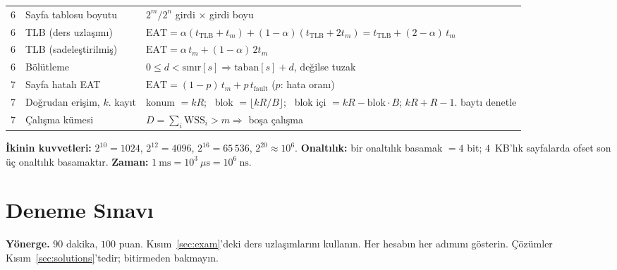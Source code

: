 \begin{center}
\begin{tabularx}{\linewidth}{@{}c >{\raggedright\arraybackslash}p{4.3cm} >{\raggedright\arraybackslash}X@{}}
6 & Sayfa tablosu boyutu & $2^{m}/2^{n}$ girdi $\times$ girdi boyu \\
6 & TLB (ders uzlaşımı) & $\text{EAT} = \alpha(t_{\text{TLB}} + t_m) + (1-\alpha)(t_{\text{TLB}} + 2t_m) = t_{\text{TLB}} + (2-\alpha)\,t_m$ \\
6 & TLB (sadeleştirilmiş) & $\text{EAT} = \alpha\,t_m + (1-\alpha)\,2t_m$ \\
6 & Bölütleme & $0 \le d < \text{sınır}[s] \Rightarrow \text{taban}[s] + d$, değilse tuzak \\
7 & Sayfa hatalı EAT & $\text{EAT} = (1-p)\,t_m + p\,t_{\text{fault}}$ \quad ($p$: hata oranı) \\
7 & Doğrudan erişim, $k$. kayıt & konum $= kR$; \ blok $= \lfloor kR/B \rfloor$; \ blok içi $= kR - \text{blok}\cdot B$; $kR + R - 1$. baytı denetle \\
7 & Çalışma kümesi & $D = \sum_i \text{WSS}_i > m \Rightarrow$ boşa çalışma \\
\bottomrule
\end{tabularx}
\end{center}
\textbf{İkinin kuvvetleri:} $2^{10} = 1024$, $2^{12} = 4096$, $2^{16} = 65\,536$, $2^{20} \approx 10^{6}$. \textbf{Onaltılık:} bir onaltılık basamak $= 4$ bit; $4$~KB'lık sayfalarda ofset son üç onaltılık basamaktır. \textbf{Zaman:} $1\ \text{ms} = 10^{3}\ \mu\text{s} = 10^{6}\ \text{ns}$.
\newpage

\section{Deneme Sınavı}
\label{sec:practice}
\textbf{Yönerge.} $90$ dakika, $100$ puan. Kısım~\ref{sec:exam}'deki ders uzlaşımlarını kullanın. Her hesabın her adımını gösterin. Çözümler Kısım~\ref{sec:solutions}'tedir; bitirmeden bakmayın.

